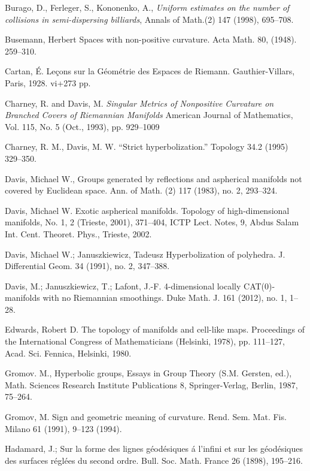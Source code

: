 \begin{thebibliography}{52}
Burago, D., Ferleger, S., Kononenko, A.,
\textit{Uniform estimates on the number of collisions in semi-dispersing billiards},
Annals of Math.(2) 147 (1998), 695--708.

Busemann, Herbert 
Spaces with non-positive curvature. Acta Math. 80, (1948). 259--310.

Cartan, \'E.
Le\c{c}ons sur la G\'eom\'etrie des Espaces de Riemann. 
Gauthier-Villars, Paris, 1928. vi+273 pp.

Charney, R. and  Davis, M.
\textit{Singular Metrics of Nonpositive Curvature on Branched Covers of Riemannian Manifolds}
American Journal of Mathematics, Vol. 115, No. 5 (Oct., 1993), pp. 929--1009

Charney, R. M., Davis, M. W. 
``Strict hyperbolization.'' Topology 34.2 (1995) 329--350.

Davis, Michael W., Groups generated by reflections and aspherical manifolds not covered by Euclidean space.
Ann. of Math. (2) 117 (1983), no. 2, 293--324. 

 Davis, Michael W. Exotic aspherical manifolds. Topology of high-dimensional manifolds, No. 1, 2 (Trieste, 2001), 371--404, ICTP Lect. Notes, 9, Abdus Salam Int. Cent. Theoret. Phys., Trieste, 2002.



 Davis, Michael W.; Januszkiewicz, Tadeusz Hyperbolization of polyhedra. J. Differential Geom. 34 (1991), no. 2, 347--388.

Davis, M.; 
Januszkiewicz, T.; 
Lafont, J.-F.
4-dimensional locally CAT(0)-manifolds with no Riemannian smoothings. 
Duke Math. J. 161 (2012), no. 1, 1--28.

 Edwards, Robert D. The topology of manifolds and cell-like maps. Proceedings of the International Congress of Mathematicians (Helsinki, 1978), pp. 111--127, Acad. Sci. Fennica, Helsinki, 1980.

Gromov. M.,
Hyperbolic groups, 
Essays in Group Theory (S.M. Gersten, ed.),
Math. Sciences Research Institute Publications 8,
Springer-Verlag, Berlin,
1987, 75--264.

Gromov, M.
Sign and geometric meaning of curvature. 
Rend. Sem. Mat. Fis. Milano 61 (1991), 9--123 (1994).

 Hadamard, J.;
Sur la forme des lignes g\'eod\'esiques \'a l'infini et sur les g\'eod\'esiques des surfaces r\'egl\'ees du second ordre.
Bull. Soc. Math. France 26 (1898), 195--216.


\end{thebibliography}

